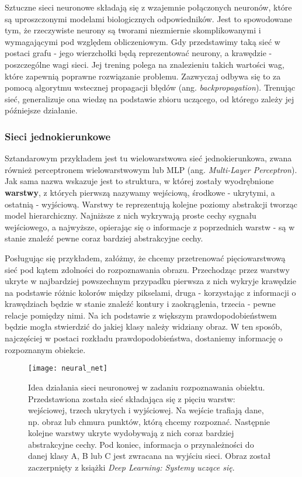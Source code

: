 \documentclass[12pt]{article}
\begin{document}
Sztuczne sieci neuronowe składają się z wzajemnie połączonych neuronów, które są uproszczonymi modelami biologicznych odpowiedników. Jest to spowodowane tym, że rzeczywiste neurony są tworami niezmiernie skomplikowanymi i wymagającymi pod względem obliczeniowym. Gdy przedstawimy taką sieć w postaci grafu - jego wierzchołki będą reprezentować neurony, a krawędzie - poszczególne wagi sieci. Jej trening polega na znalezieniu takich wartości wag, które zapewnią poprawne rozwiązanie problemu. Zazwyczaj odbywa się to za pomocą algorytmu wstecznej propagacji błędów (ang. \emph{backpropagation}). Trenując sieć, generalizuje ona wiedzę na podstawie zbioru uczącego, od którego zależy jej późniejsze działanie.

\subsubsection*{Sieci jednokierunkowe}
Sztandarowym przykładem jest tu wielowarstwowa sieć jednokierunkowa, zwana również perceptronem wielowarstwowym lub MLP (ang. \emph{Multi-Layer Perceptron}). Jak sama nazwa wskazuje jest to struktura, w której zostały wyodrębnione \textbf{warstwy}, z których pierwszą nazywamy wejściową, środkowe - ukrytymi, a ostatnią - wyjściową. Warstwy te reprezentują kolejne poziomy abstrakcji tworząc model hierarchiczny. Najniższe z nich wykrywają proste cechy sygnału wejściowego, a najwyższe, opierając się o informacje z poprzednich warstw - są w stanie znaleźć pewne coraz bardziej abstrakcyjne cechy. 

Posługując się przykładem, załóżmy, że chcemy przetrenować pięciowarstwową sieć pod kątem zdolności do rozpoznawania obrazu. Przechodząc przez warstwy ukryte w najbardziej powszechnym przypadku pierwsza z nich wykryje krawędzie na podstawie różnic kolorów między pikselami, druga - korzystając z informacji o krawędziach będzie w stanie znaleźć kontury i zaokrąglenia, trzecia - pewne relacje pomiędzy nimi. Na ich podstawie z większym prawdopodobieństwem będzie mogła stwierdzić do jakiej klasy należy widziany obraz. W ten sposób, najczęściej w postaci rozkładu prawdopodobieństwa, dostaniemy informację o rozpoznanym obiekcie.

\begin{figure}[h]
\texttt{[image: neural\_net]}
\caption{Idea działania sieci neuronowej w zadaniu rozpoznawania obiektu. Przedstawiona została sieć składająca się z pięciu warstw: wejściowej, trzech ukrytych i wyjściowej. Na wejście trafiają dane, np. obraz lub chmura punktów, którą chcemy rozpoznać. Następnie kolejne warstwy ukryte wydobywają z nich coraz bardziej abstrakcyjne cechy. Pod koniec, informacja o przynależności do danej klasy A, B lub C jest zwracana na wyjściu sieci. Obraz został zaczerpnięty z książki \emph{Deep Learning: Systemy uczące się}.}
\end{figure}
\end{document}
